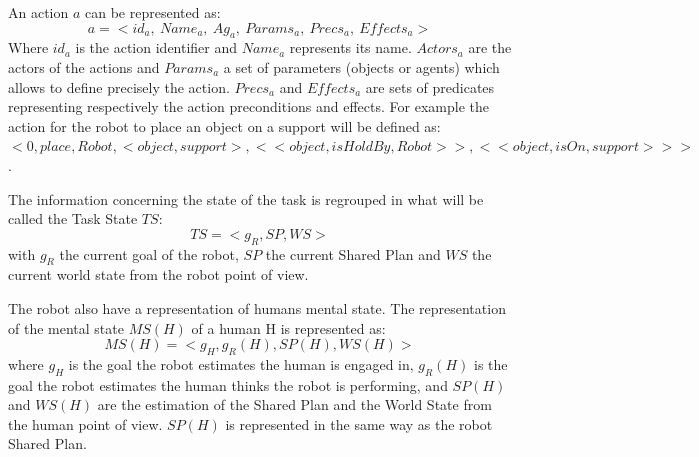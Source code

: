 \documentclass[english,a4paper,11pt,twoside]{StyleThese}
\begin{document}
An action $a$ can be represented as: 
$$a = < id_{a}, \ Name_{a}, \ Ag_{a}, \ Params_{a}, \ Precs_{a}, \ Effects_{a} >$$
Where $id_{a}$ is the action identifier and $Name_{a}$ represents its name. $Actors_{a}$ are the actors of the actions and $Params_{a}$ a set of parameters (objects or agents) which allows to define precisely the action. $Precs_{a}$ and $Effects_{a}$ are sets of predicates representing respectively the action preconditions and effects.
For example the action for the robot to place an object on a support will be defined as:$<0, place, Robot, <object, support>, <<object, isHoldBy, Robot>>, <<object, isOn, support>>>$.

The information concerning the state of the task is regrouped in what will be called the Task State $TS$:
$$TS = <g_R, SP, WS>$$
with $g_R$ the current goal of the robot, $SP$ the current Shared Plan and $WS$ the current world state from the robot point of view.

The robot also have a representation of humans mental state. The representation of the mental state $MS(H)$ of a human H is represented as:
$$MS(H) = <g_H, g_R(H), SP(H), WS(H)>$$
where $g_H$ is the goal the robot estimates the human is engaged in, $g_R(H)$ is the goal the robot estimates the human thinks the robot is performing, and $SP(H)$ and $WS(H)$ are the estimation of the Shared Plan and the World State from the human point of view.
$SP(H)$ is represented in the same way as the robot Shared Plan.


\ifdefined{}
\else


\end{document}
